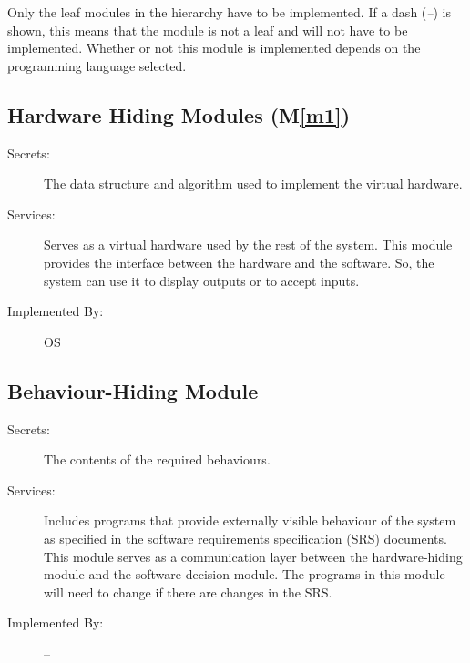 \documentclass[12pt, titlepage]{article}
\newcommand{\mref}[1]{M\ref{#1}}
\begin{document}
Only the leaf modules in the hierarchy have to be implemented. If a dash (\emph{--}) is shown, this means that the module is not a leaf and will not have to be implemented. Whether or not this module is implemented depends on the programming language selected.

\subsection{Hardware Hiding Modules (\mref{m1})}
\begin{description}
    \item[Secrets:] The data structure and algorithm used to implement the virtual hardware.
    \item[Services:] Serves as a virtual hardware used by the rest of the system. This module provides the interface between the hardware and the software. So, the system can use it to display outputs or to accept inputs.
    \item[Implemented By:] OS
\end{description}

\subsection{Behaviour-Hiding Module}

\begin{description}
\item[Secrets:] The contents of the required behaviours.
\item[Services:] Includes programs that provide externally visible behaviour of
  the system as specified in the software requirements specification (SRS)
  documents. This module serves as a communication layer between the
  hardware-hiding module and the software decision module. The programs in this
  module will need to change if there are changes in the SRS.
\item[Implemented By:] --
\end{description}

\end{document}
